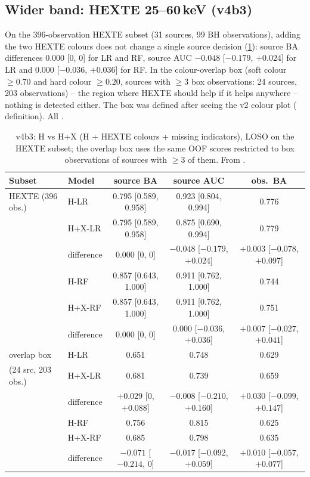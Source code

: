 \subsection{Wider band: HEXTE 25--60\,keV (v4b3)}\label{sec:p2hexteres}
\Secondary{} On the 396-observation HEXTE subset (31 sources, 99 BH observations), adding the two HEXTE colours
does not change a single source decision (\cref{tab:p2hexteres}): source BA differences $0.000$ [0, 0] for LR and RF,
source AUC $-0.048$ [$-0.179$, $+0.024$] for LR and $0.000$ [$-0.036$, $+0.036$] for RF. In the colour-overlap box
(soft colour $\ge0.70$ and hard colour $\ge0.20$, sources with $\ge3$ box observations: 24 sources, 203 observations) --
the region where HEXTE should help if it helps anywhere -- nothing is detected either. The box was defined after seeing the
v2 colour plot (\PostHoc{} definition). All \NotDetected.

\begin{table}[htbp]
\centering\small
\caption[HEXTE results]{\Secondary{} v4b3: H vs H+X (H + HEXTE colours + missing indicators), LOSO on the HEXTE subset;
the overlap box uses the same OOF scores restricted to box observations of sources with $\ge3$ of them. From
.}
\label{tab:p2hexteres}
\footnotesize\setlength{\tabcolsep}{4pt}
\begin{tabular}{@{}llccc@{}}
\toprule
Subset & Model & source BA & source AUC & obs.\ BA \\
\midrule
HEXTE (396 obs.) & H-LR & 0.795 [0.589, 0.958] & 0.923 [0.804, 0.994] & 0.776 \\
 & H+X-LR & 0.795 [0.589, 0.958] & 0.875 [0.690, 0.994] & 0.779 \\
 & \quad difference & $0.000$ [0, 0] & $-0.048$ [$-0.179$, $+0.024$] & $+0.003$ [$-0.078$, $+0.097$] \\
 & H-RF & 0.857 [0.643, 1.000] & 0.911 [0.762, 1.000] & 0.744 \\
 & H+X-RF & 0.857 [0.643, 1.000] & 0.911 [0.762, 1.000] & 0.751 \\
 & \quad difference & $0.000$ [0, 0] & $0.000$ [$-0.036$, $+0.036$] & $+0.007$ [$-0.027$, $+0.041$] \\
\midrule
overlap box & H-LR & 0.651 & 0.748 & 0.629 \\
(24 src, 203 obs.) & H+X-LR & 0.681 & 0.739 & 0.659 \\
 & \quad difference & $+0.029$ [0, $+0.088$] & $-0.008$ [$-0.210$, $+0.160$] & $+0.030$ [$-0.099$, $+0.147$] \\
 & H-RF & 0.756 & 0.815 & 0.625 \\
 & H+X-RF & 0.685 & 0.798 & 0.635 \\
 & \quad difference & $-0.071$ [$-0.214$, 0] & $-0.017$ [$-0.092$, $+0.059$] & $+0.010$ [$-0.057$, $+0.077$] \\
\bottomrule
\end{tabular}
\end{table}

